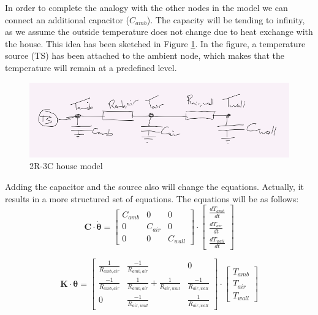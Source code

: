 In order to complete the analogy with the other nodes in the model we can connect an additional capacitor ($C_{amb}$). The capacity will be tending to infinity, as we assume the outside temperature does not change due to heat exchange with the house. This idea has been sketched in Figure \ref{fig:2R3C}. In the figure, a temperature source (TS) has been attached to the ambient node, which makes that the temperature will remain at a predefined level.  

\begin{figure}
	\centering
	\includegraphics[width=0.7\columnwidth]{Pictures/drawing_2R3C.png}
	\caption[Short title]{2R-3C house model}
	\label{fig:2R3C}
\end{figure} 


Adding the capacitor and the source also will change the equations. Actually, it results in a more structured set of equations. The equations will be as follows:
\begin{equation}
	\mathbf{C} \cdot \boldsymbol{\dot{\theta}} =
	\begin{bmatrix}
		C_{amb} & 0 & 0\\
		0 &  C_{air} & 0   \\
		0 & 0 & C_{wall} 
	\end{bmatrix}
	\cdot
	\begin{bmatrix}
		\frac{dT_{amb}}{dt} \\
		\frac{dT_{air}}{dt} \\
		\frac{dT_{wall}}{dt} 
	\end{bmatrix}
\end{equation}

\begin{equation}
	\mathbf{K} \cdot \boldsymbol{\theta} =
	\begin{bmatrix}
		\frac{1}{R_{amb, air}}  & \frac{-1}{R_{amb,air}} & 0  \\
		\frac{-1}{R_{amb, air}} &  \frac{1}{R_{amb, air}} + \frac{1}{R_{air,wall}} &  \frac{-1}{R_{air,wall}} \\
		 0 & \frac{-1}{R_{air, wall}}  & \frac{1}{R_{air,wall}} 
	\end{bmatrix}
	\cdot
	\begin{bmatrix}
		T_{amb} \\
		T_{air} \\
		T_{wall}
	\end{bmatrix}
\end{equation}

